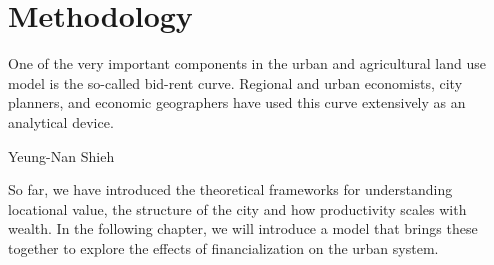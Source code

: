 \chapter{Methodology} \label{appendix-methodology}

\epigraph{One of the very important components in the urban and agricultural land use model is the so-called \gls{bid-rent curve}. Regional and urban economists, city planners, and economic geographers have used this curve extensively as an analytical device.}{Yeung-Nan Shieh \cite{shiehWilhelmLaunhardtBidRent2004}}







So far, we have introduced the theoretical frameworks for understanding locational value, the structure of the city and how productivity scales with wealth. In the following chapter, we will introduce a model that brings these together to explore the effects of financialization on the urban system. 

